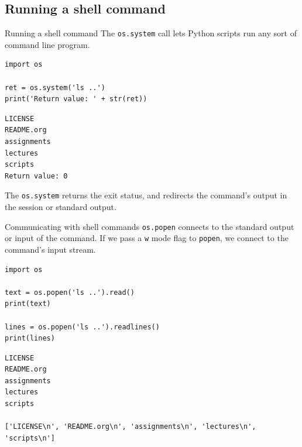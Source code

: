\documentclass[xcolor=dvipsnames, 10pt, presentation,aspectratio=169]{beamer}
\begin{document}
\subsection{Running a shell command}
\label{sec:org9436adf}
\begin{frame}[label={sec:orgc7c2072},fragile]{Running a shell command}
 The \texttt{os.system} call lets Python scripts run any sort of command line
program. 
\lstset{language=Python,label= ,caption= ,captionpos=b,numbers=none}
\begin{lstlisting}
import os

ret = os.system('ls ..')
print('Return value: ' + str(ret))
\end{lstlisting}

\begin{verbatim}
LICENSE
README.org
assignments
lectures
scripts
Return value: 0
\end{verbatim}


The \texttt{os.system} returns the exit status, and redirects the command's
output in the session or standard output.
\end{frame}
\begin{frame}[label={sec:org1ed570a},fragile]{Communicating with shell commands}
 \texttt{os.popen} connects to the standard output or input of the command. If
we pass a \texttt{w} mode flag to \texttt{popen}, we connect to the command's input
stream.
\lstset{language=Python,label= ,caption= ,captionpos=b,numbers=none}
\begin{lstlisting}
import os

text = os.popen('ls ..').read()
print(text)

lines = os.popen('ls ..').readlines()
print(lines)
\end{lstlisting}

\begin{verbatim}
LICENSE
README.org
assignments
lectures
scripts

['LICENSE\n', 'README.org\n', 'assignments\n', 'lectures\n', 'scripts\n']
\end{verbatim}
\end{frame}
\end{document}

